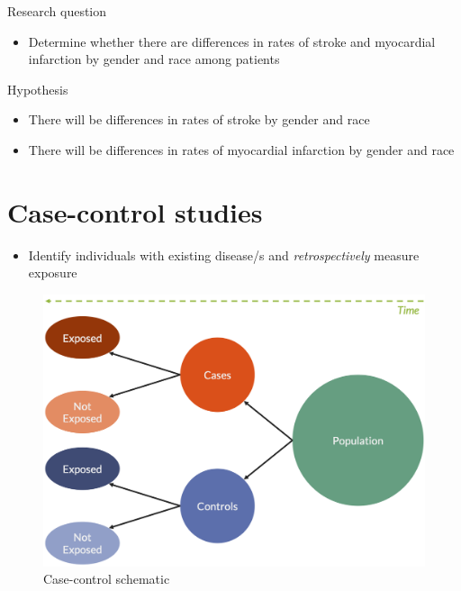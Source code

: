 \documentclass[
]{book}
\providecommand{\tightlist}{%
  \setlength{\itemsep}{0pt}\setlength{\parskip}{0pt}}
\begin{document}
Research question

\begin{itemize}
\tightlist
\item
  Determine whether there are differences in rates of stroke and myocardial infarction by gender and race among patients
\end{itemize}

Hypothesis

\begin{itemize}
\tightlist
\item
  There will be differences in rates of stroke by gender and race
\item
  There will be differences in rates of myocardial infarction by gender and race
\end{itemize}

\hypertarget{case-control-studies}{%
\section{Case-control studies}\label{case-control-studies}}

\begin{itemize}
\tightlist
\item
  Identify individuals with existing disease/s and \emph{retrospectively} measure exposure
\end{itemize}

\begin{figure}

{\centering \includegraphics[width=1\linewidth]{img/study_design/case_control_schematic} 

}

\caption{Case-control schematic}\label{fig:unnamed-chunk-6}
\end{figure}
\end{document}
